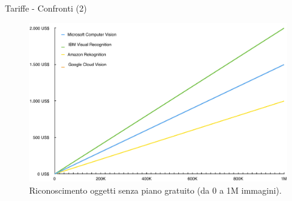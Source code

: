 %
\begin{frame}[t]{Tariffe - Confronti (2)}
	\begin{figure}[h]
	\centering
	    \includegraphics[width=.6\paperwidth,keepaspectratio=true]{../../doc/img/grafico2}
		{\tiny \caption{Riconoscimento oggetti senza piano gratuito (da 0 a 1M immagini).}}
		\label{fig:tariffe-riconoscimento-oggetti-senza-gratuito}
	\end{figure}
\end{frame}
%
